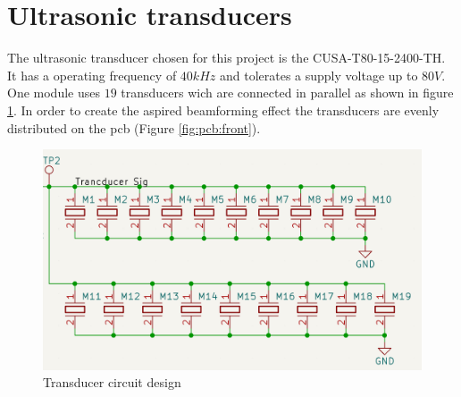\section{Ultrasonic transducers}

The ultrasonic transducer chosen for this project is the CUSA-T80-15-2400-TH. It has a operating frequency of $40kHz$ and tolerates a supply voltage up to $80V$.\p
One module uses $19$ transducers wich are connected in parallel as shown in figure \ref{fig:pcb:transducer_circuit}. In order to create the aspired beamforming effect the transducers are evenly distributed on the pcb (Figure \ref{fig:pcb:front}).
%
\begin{figure}
  \centering
  \includegraphics[height=\mediumheight]{src/assets/pictures/circuit/transducer_circuit.png}
  \caption{Transducer circuit design}\label{fig:pcb:transducer_circuit}
\end{figure}
